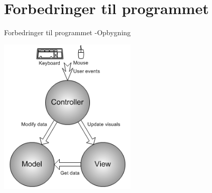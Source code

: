 \section{Forbedringer til programmet}

\begin{frame}{Forbedringer til programmet -Opbygning}
 

\end{frame}
\begin{frame}
\begin{center}
  \includegraphics[width=0.5\textwidth]{images/mvc.png}
\end{center} 
\end{frame}